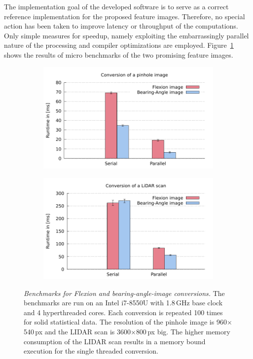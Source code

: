 The implementation goal of the developed software is to serve as a correct reference implementation for the proposed feature images.
Therefore, no special action has been taken to improve latency or throughput of the computations.
Only simple measures for speedup, namely exploiting the embarrassingly parallel nature of the processing and compiler optimizations are employed.
Figure~\ref{fig:benchmarks} shows the results of micro benchmarks of the two promising feature images.
\begin{figure}
\centering
    \begin{subfigure}[b]{0.49\linewidth}
        \includegraphics[width=\linewidth]{chapter06/results/benchmarks/pinhole_benchmarks.pdf}
    \end{subfigure}
    \begin{subfigure}[b]{0.49\linewidth}
        \includegraphics[width=\linewidth]{chapter06/results/benchmarks/laserscan_benchmarks.pdf}
    \end{subfigure}
    \caption[Benchmarks for Flexion and \gls{bearing-angle-image} conversions]{\emph{Benchmarks for Flexion and \gls{bearing-angle-image} conversions.} The benchmarks are run on an Intel i7-8550U with 1.8\,GHz base clock and 4 hyperthreaded cores. Each conversion is repeated 100 times for solid statistical data. The resolution of the pinhole image is 960$\times$540\,px and the \acrshort{LIDAR} scan is 3600$\times$800\,px big. The higher memory consumption of the \acrshort{LIDAR} scan results in a memory bound execution for the single threaded conversion.}\label{fig:benchmarks}
\end{figure}
